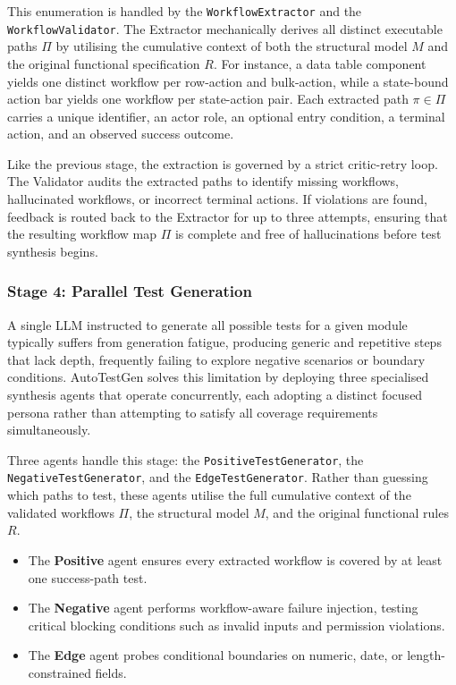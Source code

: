 This enumeration is handled by the \texttt{WorkflowExtractor} and the \texttt{WorkflowValidator}. The Extractor mechanically derives all distinct executable paths $\Pi$ by utilising the cumulative context of both the structural model $M$ and the original functional specification $R$. For instance, a data table component yields one distinct workflow per row-action and bulk-action, while a state-bound action bar yields one workflow per state-action pair. Each extracted path $\pi \in \Pi$ carries a unique identifier, an actor role, an optional entry condition, a terminal action, and an observed success outcome.

Like the previous stage, the extraction is governed by a strict critic-retry loop. The Validator audits the extracted paths to identify missing workflows, hallucinated workflows, or incorrect terminal actions. If violations are found, feedback is routed back to the Extractor for up to three attempts, ensuring that the resulting workflow map $\Pi$ is complete and free of hallucinations before test synthesis begins.

\subsubsection{Stage 4: Parallel Test Generation}

A single LLM instructed to generate all possible tests for a given module typically suffers from generation fatigue, producing generic and repetitive steps that lack depth, frequently failing to explore negative scenarios or boundary conditions. AutoTestGen solves this limitation by deploying three specialised synthesis agents that operate concurrently, each adopting a distinct focused persona rather than attempting to satisfy all coverage requirements simultaneously.

Three agents handle this stage: the \texttt{PositiveTestGenerator}, the \texttt{NegativeTestGenerator}, and the \texttt{EdgeTestGenerator}. Rather than guessing which paths to test, these agents utilise the full cumulative context of the validated workflows $\Pi$, the structural model $M$, and the original functional rules $R$.

\begin{itemize}
    \item The \textbf{Positive} agent ensures every extracted workflow is covered by at least one success-path test.
    \item The \textbf{Negative} agent performs workflow-aware failure injection, testing critical blocking conditions such as invalid inputs and permission violations.
    \item The \textbf{Edge} agent probes conditional boundaries on numeric, date, or length-constrained fields.
\end{itemize}

